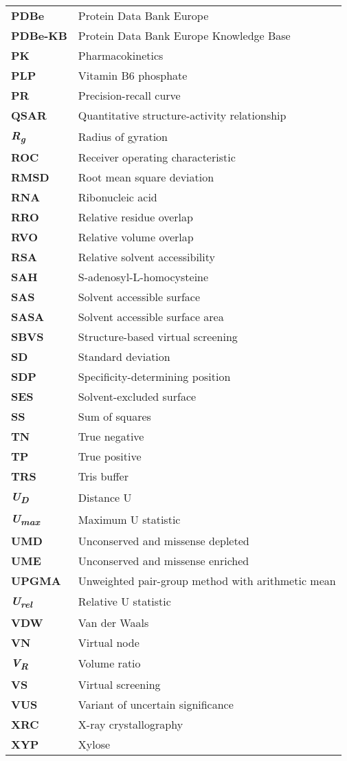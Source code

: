 \begin{longtable}[l]{@{}p{2.5cm}p{12cm}@{}}
\textbf{PDBe} & Protein Data Bank Europe \\
\textbf{PDBe-KB} & Protein Data Bank Europe Knowledge Base \\
\textbf{PK} & Pharmacokinetics \\
\textbf{PLP} & Vitamin B6 phosphate \\
\textbf{PR} & Precision-recall curve \\
\textbf{QSAR} & Quantitative structure-activity relationship \\
\textbf{\textit{R\textsubscript{g}}} & Radius of gyration \\
\textbf{ROC} & Receiver operating characteristic \\
\textbf{RMSD} & Root mean square deviation \\
\textbf{RNA} & Ribonucleic acid \\
\textbf{RRO} & Relative residue overlap \\
\textbf{RVO} & Relative volume overlap \\
\textbf{RSA} & Relative solvent accessibility \\
\textbf{SAH} & S-adenosyl-L-homocysteine \\
\textbf{SAS} & Solvent accessible surface \\
\textbf{SASA} & Solvent accessible surface area \\
\textbf{SBVS} & Structure-based virtual screening \\
\textbf{SD} & Standard deviation \\
\textbf{SDP} & Specificity-determining position \\
\textbf{SES} & Solvent-excluded surface \\
\textbf{SS} & Sum of squares \\
\textbf{TN} & True negative \\
\textbf{TP} & True positive \\
\textbf{TRS} & Tris buffer \\
\textbf{\textit{U\textsubscript{D}}} & Distance U \\
\textbf{\textit{U\textsubscript{max}}} & Maximum U statistic \\
\textbf{UMD} & Unconserved and missense depleted \\
\textbf{UME} & Unconserved and missense enriched \\
\textbf{UPGMA} & Unweighted pair-group method with arithmetic mean \\
\textbf{\textit{U\textsubscript{rel}}} & Relative U statistic \\
\textbf{VDW} & Van der Waals \\
\textbf{VN} & Virtual node \\
\textbf{\textit{V\textsubscript{R}}} & Volume ratio \\
\textbf{VS} & Virtual screening \\
\textbf{VUS} & Variant of uncertain significance \\
\textbf{XRC} & X-ray crystallography \\
\textbf{XYP} & Xylose \\

\end{longtable}
